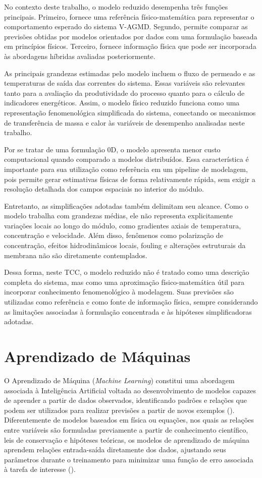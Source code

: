 No contexto deste trabalho, o modelo reduzido desempenha três funções principais. Primeiro, fornece uma referência físico-matemática para representar o comportamento esperado do sistema V-AGMD. Segundo, permite comparar as previsões obtidas por modelos orientados por dados com uma formulação baseada em princípios físicos. Terceiro, fornece informação física que pode ser incorporada às abordagens híbridas avaliadas posteriormente.

As principais grandezas estimadas pelo modelo incluem o fluxo de permeado e as temperaturas de saída das correntes do sistema. Essas variáveis são relevantes tanto para a avaliação da produtividade do processo quanto para o cálculo de indicadores energéticos. Assim, o modelo físico reduzido funciona como uma representação fenomenológica simplificada do sistema, conectando os mecanismos de transferência de massa e calor às variáveis de desempenho analisadas neste trabalho.

Por se tratar de uma formulação 0D, o modelo apresenta menor custo computacional quando comparado a modelos distribuídos. Essa característica é importante para sua utilização como referência em um pipeline de modelagem, pois permite gerar estimativas físicas de forma relativamente rápida, sem exigir a resolução detalhada dos campos espaciais no interior do módulo.

Entretanto, as simplificações adotadas também delimitam seu alcance. Como o modelo trabalha com grandezas médias, ele não representa explicitamente variações locais ao longo do módulo, como gradientes axiais de temperatura, concentração e velocidade. Além disso, fenômenos como polarização de concentração, efeitos hidrodinâmicos locais, fouling e alterações estruturais da membrana não são diretamente contemplados.

Dessa forma, neste TCC, o modelo reduzido não é tratado como uma descrição completa do sistema, mas como uma aproximação físico-matemática útil para incorporar conhecimento fenomenológico à modelagem. Suas previsões são utilizadas como referência e como fonte de informação física, sempre considerando as limitações associadas à formulação concentrada e às hipóteses simplificadoras adotadas.
\section{Aprendizado de Máquinas}

O Aprendizado de Máquina (\textit{Machine Learning}) constitui uma abordagem associada à Inteligência Artificial voltada ao desenvolvimento de modelos capazes de aprender a partir de dados observados, identificando padrões e relações que podem ser utilizados para realizar previsões a partir de novos exemplos (\cite{Ghahramani2015}). Diferentemente de modelos baseados em física ou equações, nos quais as relações entre variáveis são formuladas previamente a partir de conhecimento científico, leis de conservação e hipóteses teóricas, os modelos de aprendizado de máquina aprendem relações entrada-saída diretamente dos dados, ajustando seus parâmetros durante o treinamento para minimizar uma função de erro associada à tarefa de interesse (\cite{Rai2020}).


